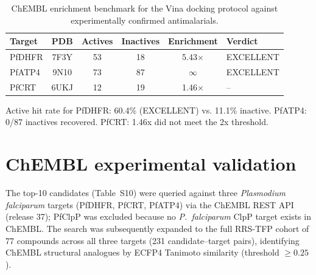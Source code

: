 \documentclass[11pt,a4paper]{article}
\begin{document}
\begin{table}[htbp]
\centering
\caption{ChEMBL enrichment benchmark for the Vina docking protocol against experimentally confirmed antimalarials.}
\label{tab:chembl_enrichment}
\begin{tabularx}{\textwidth}{l c c c c l}
\toprule
Target & PDB & {Actives} & {Inactives} & {Enrichment} & Verdict \\
\midrule
PfDHFR & 7F3Y & 53 & 18 & 5.43$\times$ & EXCELLENT \\
PfATP4 & 9N10 & 73 & 87 & $\infty$ & EXCELLENT \\
PfCRT & 6UKJ & 12 & 19 & 1.46$\times$ & -- \\
\bottomrule
\end{tabularx}
\vspace{1mm}
\footnotesize Active hit rate for PfDHFR: 60.4\% (EXCELLENT) vs. 11.1\% inactive. PfATP4: 0/87 inactives recovered. PfCRT: 1.46x did not meet the 2x threshold.
\end{table}




\section{ChEMBL experimental validation}
\label{sec:chembl_validation}

The top-10 candidates (Table~S10) were queried against three \textit{Plasmodium falciparum} targets (PfDHFR, PfCRT, PfATP4) via the ChEMBL REST API (release 37); PfClpP was excluded because no \textit{P.~falciparum} ClpP target exists in ChEMBL. The search was subsequently expanded to the full RRS-TFP cohort of 77 compounds across all three targets (231 candidate--target pairs), identifying ChEMBL structural analogues by ECFP4 Tanimoto similarity (threshold $\geq 0.25$).
\end{document}

